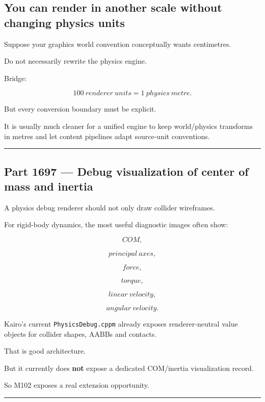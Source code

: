 \subsection{You can render in another scale without changing physics units}\label{06-engine-ii-ch039-you-can-render-in-another-scale-without-changing-physics-units}

Suppose your graphics world convention conceptually wants centimetres.

Do not necessarily rewrite the physics engine.

Bridge:

\[
100\ renderer\ units
=
1\ physics\ metre.
\]

But every conversion boundary must be explicit.

It is usually much cleaner for a unified engine to keep world/physics transforms in metres and let content pipelines adapt source-unit conventions.

\begin{center}\rule{0.5\linewidth}{0.5pt}\end{center}

\subsection{Part 1697 --- Debug visualization of center of mass and inertia}\label{06-engine-ii-ch039-part-1697-debug-visualization-of-center-of-mass-and-inertia}

A physics debug renderer should not only draw collider wireframes.

For rigid-body dynamics, the most useful diagnostic images often show:

\[
COM,
\]

\[
principal\ axes,
\]

\[
force,
\]

\[
torque,
\]

\[
linear\ velocity,
\]

\[
angular\ velocity.
\]

Kairo's current \texttt{PhysicsDebug.cppm} already exposes renderer-neutral value objects for collider shapes, AABBs and contacts.

That is good architecture.

But it currently does \textbf{not} expose a dedicated COM/inertia visualization record.

So M102 exposes a real extension opportunity.

\begin{center}\rule{0.5\linewidth}{0.5pt}\end{center}

